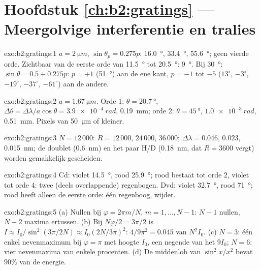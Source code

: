 \section*{Hoofdstuk \ref{ch:b2:gratings} --- Meergolvige interferentie en tralies}

\begin{solution}{exo:b2:gratings:1}
$a = \qty{2}{\micro m}$, $\sin\theta_p = 0.275p$: \qty{16.0}{\degree},
\qty{33.4}{\degree}, \qty{55.6}{\degree};
geen vierde orde. Zichtbaar van de eerste orde van \qty{11.5}{\degree} tot
\qty{20.5}{\degree}:
\qty{9}{\degree}. Bij \qty{30}{\degree}: $\sin\theta = 0.5 + 0.275p$:
$p = +1$ (\qty{51}{\degree}) aan de ene
kant, $p = -1$ tot $-5$ ($13^\circ$, $-3^\circ$, $-19^\circ$, $-37^\circ$,
$-61^\circ$) aan de
andere.
\end{solution}

\begin{solution}{exo:b2:gratings:2}
$a = \qty{1.67}{\micro m}$. Orde 1: $\theta = \qty{20.7}{\degree}$,
$\Delta\theta = \Delta\lambda/a\cos\theta =
\qty{3.9e-4}{rad}$,
\qty{0.19}{mm}; orde 2: $\theta = \qty{45}{\degree}$, $\qty{1.0e-3}{rad}$,
\qty{0.51}{mm}. Pixels van \qty{50}{\micro m} of kleiner.
\end{solution}

\begin{solution}{exo:b2:gratings:3}
$N = 12\,000$: $R = 12\,000$, $24\,000$, $36\,000$; $\Delta\lambda = 0.046$,
$0.023$, \qty{0.015}{nm};
de doublet (\qty{0.6}{nm}) en het paar H/D (\qty{0.18}{nm}, dat $R = 3600$ vergt)
worden gemakkelijk gescheiden.
\end{solution}

\begin{solution}{exo:b2:gratings:4}
Cd: violet \qty{14.5}{\degree}, rood \qty{25.9}{\degree}; rood bestaat tot
orde 2, violet tot
orde 4: twee (deels overlappende) regenbogen. Dvd: violet \qty{32.7}{\degree}, rood
\qty{71}{\degree}; rood heeft alleen de eerste orde: één regenboog, wijder.
\end{solution}

\begin{solution}{exo:b2:gratings:5}
(a) Nullen bij $\varphi = 2\pi m/N$, $m = 1, \dots, N - 1$: $N - 1$ nullen,
$N - 2$ maxima
ertussen. (b) Bij $N\varphi/2 = 3\pi/2$ is
$I \approx I_0/\sin^2(3\pi/2N) \approx I_0(2N/3\pi)^2$:
$4/9\pi^2 = 0.045$ van $N^2I_0$. (c) $N = 3$: één enkel nevenmaximum bij
$\varphi = \pi$ met hoogte $I_0$, een negende van het  $9I_0$;
$N = 6$: vier
nevenmaxima van enkele procenten. (d) De middenlob van $\sin^2x/x^2$
bevat $90\%$ van de energie.
\end{solution}


